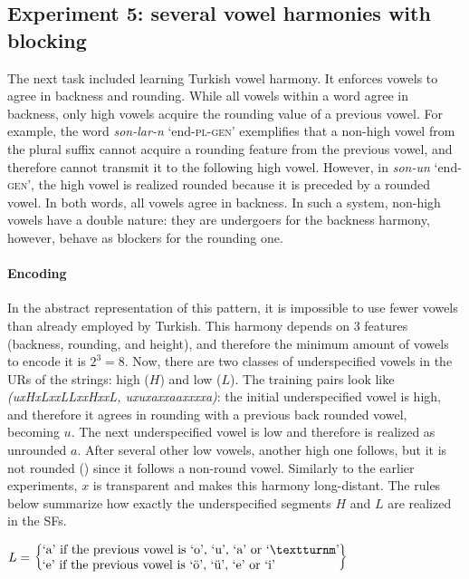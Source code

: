 \subsection{Experiment 5: several vowel harmonies with blocking}

The next task included learning Turkish vowel harmony.
It enforces vowels to agree in backness and rounding.
While all vowels within a word agree in backness, only high vowels acquire the rounding value of a previous vowel.
For example, the word \emph{son-lar-\textturnm n} `end-\textsc{pl-gen}' exemplifies that a non-high vowel from the plural suffix cannot acquire a rounding feature from the previous vowel, and therefore cannot transmit it to the following high vowel.
However, in \emph{son-un} `end-\textsc{gen}', the high vowel is realized rounded because it is preceded by a rounded vowel.
In both words, all vowels agree in backness.
In such a system, non-high vowels have a double nature: they are undergoers for the backness harmony, however, behave as blockers for the rounding one.


\paragraph{Encoding}

In the abstract representation of this pattern, it is impossible to use fewer vowels than already employed by Turkish.
This harmony depends on $3$ features (backness, rounding, and height), and therefore the minimum amount of vowels to encode it is $2^3 = 8$.
Now, there are two classes of underspecified vowels in the URs of the strings: high ($H$) and low ($L$).
The training pairs look like \emph{(uxHxLxxLLxxHxxL, uxuxaxxaaxx\textturnm xxa)}: the initial underspecified vowel is high, and therefore it agrees in rounding with a previous back rounded vowel, becoming $u$.
The next underspecified vowel is low and therefore is realized as unrounded $a$.
After several other low vowels, another high one follows, but it is not rounded (\textturnm) since it follows a non-round vowel.
Similarly to the earlier experiments, $x$ is transparent and makes this harmony long-distant.
The rules below summarize how exactly the underspecified segments $H$ and $L$ are realized in the SFs.

\medskip

$L = 
\left\{
\begin{tabular}{@{}l@{}}
    \textrm{`a' if the previous vowel is `o', `u', `a' or `\textturnm'} \\
    \textrm{`e' if the previous vowel is `\"o', `\"u', `e' or `i'}
\end{tabular}
\right\}$

